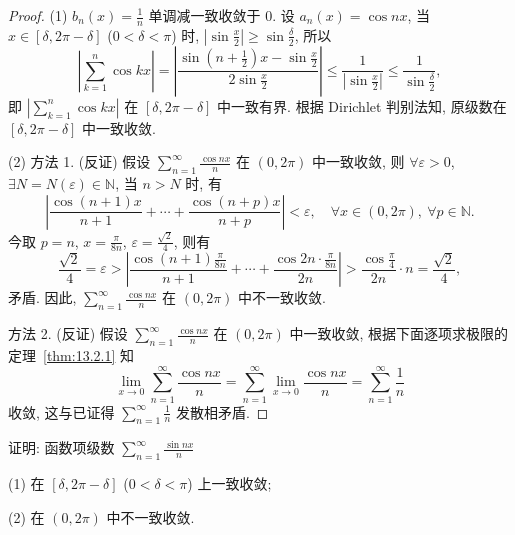 \begin{proof}
(1) $b_{n}(x)=\frac{1}{n}$ 单调减一致收敛于 $0$. 设 $a_{n}(x)=\cos nx$, 当 $x\in[\delta,2\pi-\delta]$ ($0<\delta<\pi$) 时, $\left|\sin\frac{x}{2}\right|\geqslant\sin\frac{\delta}{2}$, 所以
\[
  \left|\sum_{k=1}^{n}\cos kx\right|=\left|\frac{\sin\left(n+\frac{1}{2}\right)x-\sin\frac{x}{2}}{2\sin\frac{x}{2}}\right|\leqslant\frac{1}{\left|\sin\frac{x}{2}\right|}\leqslant\frac{1}{\sin\frac{\delta}{2}},
\]
即 $\left|\sum_{k=1}^{n}\cos kx\right|$ 在 $[\delta,2\pi-\delta]$ 中一致有界. 根据 Dirichlet 判别法知, 原级数在 $[\delta,2\pi-\delta]$ 中一致收敛.

(2) 方法 1. (反证) 假设 $\sum_{n=1}^{\infty}\frac{\cos nx}{n}$ 在 $(0,2\pi)$ 中一致收敛, 则 $\forall\varepsilon>0$, $\exists N=N(\varepsilon)\in\mathbb{N}$, 当 $n>N$ 时, 有
\[
  \left|\frac{\cos(n+1)x}{n+1}+\cdots+\frac{\cos(n+p)x}{n+p}\right|<\varepsilon,\quad\forall x\in(0,2\pi),\ \forall p\in\mathbb{N}.
\]
今取 $p=n$, $x=\frac{\pi}{8n}$, $\varepsilon=\frac{\sqrt{2}}{4}$, 则有
\[
  \frac{\sqrt{2}}{4}=\varepsilon>\left|\frac{\cos(n+1)\frac{\pi}{8n}}{n+1}+\cdots+\frac{\cos2n\cdot\frac{\pi}{8n}}{2n}\right|>\frac{\cos\frac{\pi}{4}}{2n}\cdot n=\frac{\sqrt{2}}{4},
\]
矛盾. 因此, $\sum_{n=1}^{\infty}\frac{\cos nx}{n}$ 在 $(0,2\pi)$ 中不一致收敛.

方法 2. (反证) 假设 $\sum_{n=1}^{\infty}\frac{\cos nx}{n}$ 在 $(0,2\pi)$ 中一致收敛, 根据下面逐项求极限的定理~\ref{thm:13.2.1} 知
\[
  \lim_{x\to0}\sum_{n=1}^{\infty}\frac{\cos nx}{n}=\sum_{n=1}^{\infty}\lim_{x\to0}\frac{\cos nx}{n}=\sum_{n=1}^{\infty}\frac{1}{n}
\]
收敛, 这与已证得 $\sum_{n=1}^{\infty}\frac{1}{n}$ 发散相矛盾.
\end{proof}

\begin{example}\label{ex:13.1.17}
证明: 函数项级数 $\sum_{n=1}^{\infty}\frac{\sin nx}{n}$

(1) 在 $[\delta,2\pi-\delta]$ ($0<\delta<\pi$) 上一致收敛;

(2) 在 $(0,2\pi)$ 中不一致收敛.
\end{example}

